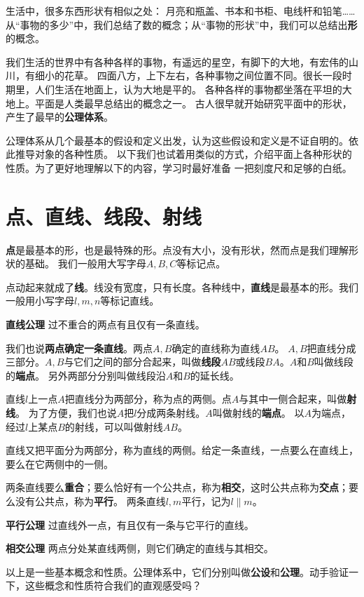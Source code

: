 \documentclass[12pt,UTF8,fontset=none]{ctexbook}
\begin{document}
生活中，很多东西形状有相似之处：
月亮和瓶盖、书本和书柜、电线杆和铅笔……
从“事物的多少”中，我们总结了数的概念；从“事物的形状”中，我们可以总结出\textbf{形}的概念。

我们生活的世界中有各种各样的事物，有遥远的星空，有脚下的大地，有宏伟的山川，有细小的花草。
四面八方，上下左右，各种事物之间位置不同。很长一段时期里，人们生活在地面上，认为大地是平的。
各种各样的事物都坐落在平坦的大地上。平面是人类最早总结出的概念之一。
古人很早就开始研究平面中的形状，产生了最早的\textbf{公理体系}。

公理体系从几个最基本的假设和定义出发，认为这些假设和定义是不证自明的。依此推导对象的各种性质。
以下我们也试着用类似的方式，介绍平面上各种形状的性质。为了更好地理解以下的内容，学习时最好准备
一把刻度尺和足够的白纸。

\section{点、直线、线段、射线}
\textbf{点}是最基本的形，也是最特殊的形。点没有大小，没有形状，然而点是我们理解形状的基础。
我们一般用大写字母$A,B,C$等标记点。

点动起来就成了\textbf{线}。线没有宽度，只有长度。各种线中，\textbf{直线}是最基本的形。我们一般用小写字母$l,m,n$等标记直线。
\begin{po}{\textbf{直线公理}}\label{po:0}
    过不重合的两点有且仅有一条直线。
\end{po}
我们也说\textbf{两点确定一条直线}。两点$A,B$确定的直线称为直线$AB$。
$A,B$把直线分成三部分。$A,B$与它们之间的部分合起来，叫做\textbf{线段}$AB$或线段$BA$。$A$和$B$叫做线段的\textbf{端点}。
另外两部分分别叫做线段沿$A$和$B$的延长线。

直线$l$上一点$A$把直线分为两部分，称为点的两侧。点$A$与其中一侧合起来，叫做\textbf{射线}。
为了方便，我们也说$A$把$l$分成两条射线。$A$叫做射线的\textbf{端点}。
以$A$为端点，经过$l$上某点$B$的射线，可以叫做射线$AB$。

直线又把平面分为两部分，称为直线的两侧。给定一条直线，一点要么在直线上，要么在它两侧中的一侧。

两条直线要么\textbf{重合}；要么恰好有一个公共点，称为\textbf{相交}，这时公共点称为\textbf{交点}；要么没有公共点，称为\textbf{平行}。
两条直线$l,m$平行，记为$l \parallel m$。
\begin{po}{\textbf{平行公理}}\label{po:1}
    过直线外一点，有且仅有一条与它平行的直线。
\end{po}
\begin{po}{\textbf{相交公理}}\label{po:2}
    两点分处某直线两侧，则它们确定的直线与其相交。
\end{po}
以上是一些基本概念和性质。公理体系中，它们分别叫做\textbf{公设}和\textbf{公理}。动手验证一下，这些概念和性质符合我们的直观感受吗？
\end{document}
